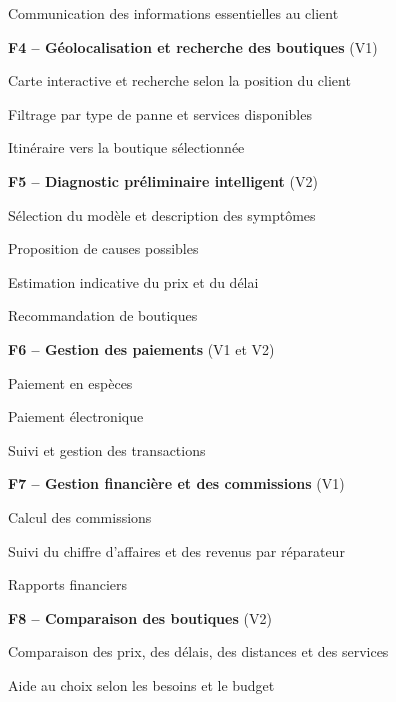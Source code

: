 \begin{cdcitems}
\begin{cdcsousitems}
    \item Communication des informations essentielles au client
  \end{cdcsousitems}
  \item \textbf{F4 – Géolocalisation et recherche des boutiques} (V1)
  \begin{cdcsousitems}
    \item Carte interactive et recherche selon la position du client
    \item Filtrage par type de panne et services disponibles
    \item Itinéraire vers la boutique sélectionnée
  \end{cdcsousitems}
  \item \textbf{F5 – Diagnostic préliminaire intelligent} (V2)
  \begin{cdcsousitems}
    \item Sélection du modèle et description des symptômes
    \item Proposition de causes possibles
    \item Estimation indicative du prix et du délai
    \item Recommandation de boutiques
  \end{cdcsousitems}
  \item \textbf{F6 – Gestion des paiements} (V1 et V2)
  \begin{cdcsousitems}
    \item Paiement en espèces
    \item Paiement électronique
    \item Suivi et gestion des transactions
  \end{cdcsousitems}
  \item \textbf{F7 – Gestion financière et des commissions} (V1)
  \begin{cdcsousitems}
    \item Calcul des commissions
    \item Suivi du chiffre d’affaires et des revenus par réparateur
    \item Rapports financiers
  \end{cdcsousitems}
  \item \textbf{F8 – Comparaison des boutiques} (V2)
  \begin{cdcsousitems}
    \item Comparaison des prix, des délais, des distances et des services
    \item Aide au choix selon les besoins et le budget
  \end{cdcsousitems}

\end{cdcitems}
